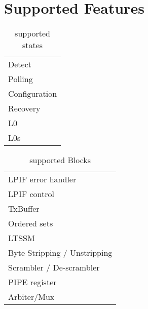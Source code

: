 \section{Supported Features}
\begin{table}[H]
    \caption{supported states}
    \centering
  \begin{tabular}{ |m{26mm}|}
\hline
\rowcolor{Gray}
\multicolumn{1}{|c|}{\textbf{
Supported States
} } \\
\hline

Detect \\ \hline 
Polling \\ \hline
Configuration\\ \hline
Recovery\\ \hline
L0\\ \hline 
L0s \\ \hline
\end{tabular}

\end{table}



\begin{table}[H]
    \caption{supported Blocks}
    \centering
  \begin{tabular}{ |m{26mm}|}
\hline
\rowcolor{Gray}
\multicolumn{1}{|c|}{\textbf{
Supported Blocks
} } 
\\
\hline


LPIF error handler \\ \hline 

LPIF control  \\ \hline
TxBuffer  \\ \hline
Ordered sets  \\ \hline
LTSSM  \\ \hline 
Byte Stripping / Unstripping 
 \\ \hline

Scrambler / De-scrambler  \\ \hline
PIPE register  
 \\ \hline
Arbiter/Mux \\ \hline
\end{tabular}
\end{table}



